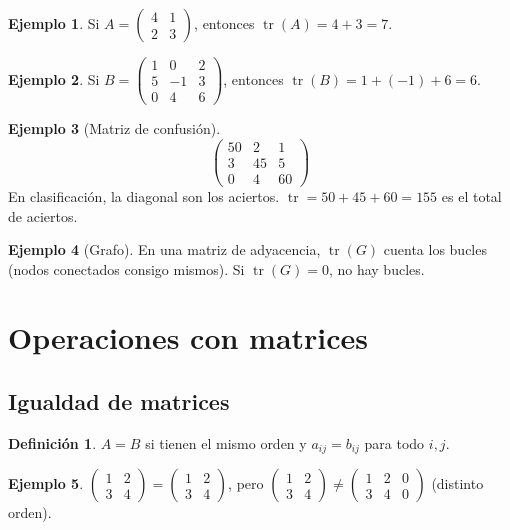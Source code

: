 \documentclass[a4paper,12pt]{article}
\theoremstyle{definition}
\newtheorem{definicion}{Definición}[section]
\newtheorem{ejemplo}{Ejemplo}[section]
\begin{document}
\begin{ejemplo}
Si $A = \begin{pmatrix} 4 & 1 \\ 2 & 3 \end{pmatrix}$, entonces $\operatorname{tr}(A)=4+3=7$.
\end{ejemplo}

\begin{ejemplo}
Si $B = \begin{pmatrix} 1 & 0 & 2 \\ 5 & -1 & 3 \\ 0 & 4 & 6 \end{pmatrix}$, entonces $\operatorname{tr}(B)=1+(-1)+6=6$.
\end{ejemplo}

\begin{ejemplo}[Matriz de confusión]
\[
\begin{pmatrix}
50 & 2 & 1 \\
3 & 45 & 5 \\
0 & 4 & 60
\end{pmatrix}
\]
En clasificación, la diagonal son los aciertos. $\operatorname{tr}=50+45+60=155$ es el total de aciertos.
\end{ejemplo}

\begin{ejemplo}[Grafo]
En una matriz de adyacencia, $\operatorname{tr}(G)$ cuenta los bucles (nodos conectados consigo mismos). Si $\operatorname{tr}(G)=0$, no hay bucles.
\end{ejemplo}

\section{Operaciones con matrices}

\subsection{Igualdad de matrices}
\begin{definicion}
$A=B$ si tienen el mismo orden y $a_{ij}=b_{ij}$ para todo $i,j$.
\end{definicion}

\begin{ejemplo}
$\begin{pmatrix} 1 & 2 \\ 3 & 4 \end{pmatrix} = \begin{pmatrix} 1 & 2 \\ 3 & 4 \end{pmatrix}$, pero $\begin{pmatrix} 1 & 2 \\ 3 & 4 \end{pmatrix} \neq \begin{pmatrix} 1 & 2 & 0 \\ 3 & 4 & 0 \end{pmatrix}$ (distinto orden).
\end{ejemplo}
\end{document}
